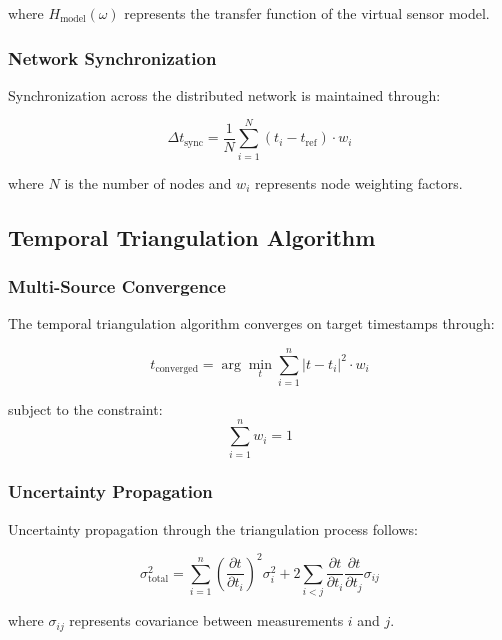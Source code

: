 \documentclass[12pt,a4paper]{article}
\begin{document}
{{{{{{{{{{{{{{where $H_{\text{model}}(\omega)$ represents the transfer function of the virtual sensor model.

\subsubsection{Network Synchronization}

Synchronization across the distributed network is maintained through:

\begin{equation}
\Delta t_{\text{sync}} = \frac{1}{N} \sum_{i=1}^{N} (t_i - t_{\text{ref}}) \cdot w_i
\end{equation}

where $N$ is the number of nodes and $w_i$ represents node weighting factors.

\subsection{Temporal Triangulation Algorithm}

\subsubsection{Multi-Source Convergence}

The temporal triangulation algorithm converges on target timestamps through:

\begin{equation}
t_{\text{converged}} = \arg\min_t \sum_{i=1}^{n} |t - t_i|^2 \cdot w_i
\end{equation}

subject to the constraint:
\begin{equation}
\sum_{i=1}^{n} w_i = 1
\end{equation}

\subsubsection{Uncertainty Propagation}

Uncertainty propagation through the triangulation process follows:

\begin{equation}
\sigma_{\text{total}}^2 = \sum_{i=1}^{n} \left(\frac{\partial t}{\partial t_i}\right)^2 \sigma_i^2 + 2\sum_{i<j} \frac{\partial t}{\partial t_i} \frac{\partial t}{\partial t_j} \sigma_{ij}
\end{equation}

where $\sigma_{ij}$ represents covariance between measurements $i$ and $j$.

}}}}}}}}}}}}}}
\end{document}
